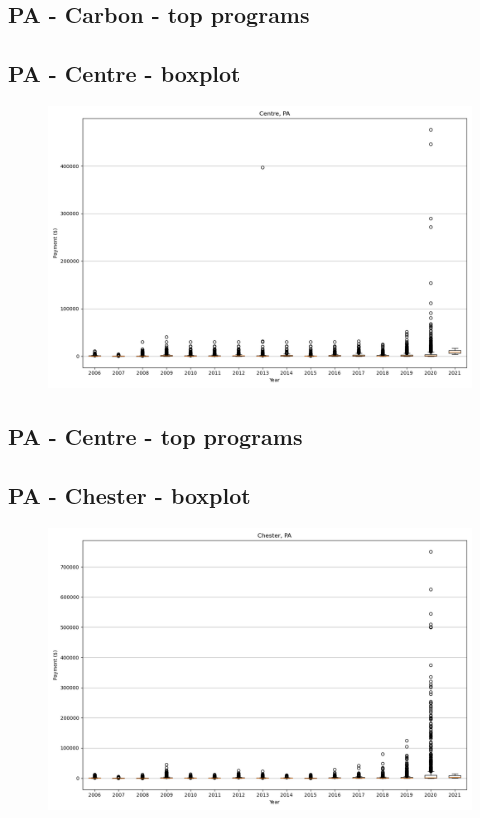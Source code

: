 \subsection*{PA - Carbon - top programs}

\newpage
\subsection*{PA - Centre - boxplot}
\begin{figure}[h]
\centering
\includegraphics[width=7in]{../output/boxplots/counties/Centre-PA_boxplot.png}
\end{figure}


\subsection*{PA - Centre - top programs}

\newpage
\subsection*{PA - Chester - boxplot}
\begin{figure}[h]
\centering
\includegraphics[width=7in]{../output/boxplots/counties/Chester-PA_boxplot.png}
\end{figure}


